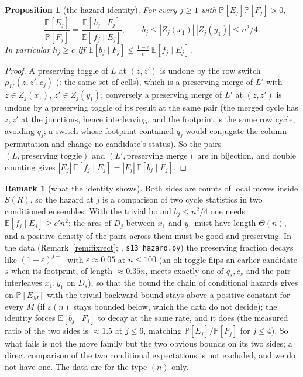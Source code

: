 \documentclass[11pt]{article}
\newtheorem{proposition}[theorem]{Proposition}
\theoremstyle{definition}
\newtheorem{remark}[theorem]{Remark}
\renewcommand{\Pr}{\mathbb{P}}
\begin{document}
\begin{proposition}[the hazard identity]\label{prop:hazardid}
For every $j\ge1$ with $\Pr[E_j]\Pr[F_j]>0$,
\[
\frac{\Pr[E_j]}{\Pr[F_j]}=\frac{\mathbb E[\,b_j\mid F_j]}{\mathbb E[\,f_j\mid E_j]},
\qquad b_j\le|Z_j(x_1)|\,|Z_j(y_1)|\le n^2/4 .
\]
In particular $h_j\ge c$ iff $\mathbb E[b_j\mid F_j]\le\frac{1-c}{c}\,\mathbb E[f_j\mid E_j]$.
\end{proposition}

\begin{proof}
A preserving toggle of $L$ at $(z,z')$ is undone by the row switch $\rho_{L'}(z,z',c_j)$
(\cite[Fact~2.1]{AM26}: the same set of cells), which is a preserving merge of $L'$ with
$z\in Z_j(x_1)$, $z'\in Z_j(y_1)$; conversely a preserving merge of $L'$ at $(z,z')$ is
undone by a preserving toggle of its result at the same pair (the merged cycle has $z,z'$
at the junctions, hence interleaving, and the footprint is the same row cycle, avoiding
$q_j$; a switch whose footprint contained $q_j$ would conjugate the column permutation and
change no candidate's status).  So the pairs $(L,\text{preserving toggle})$ and
$(L',\text{preserving merge})$ are in bijection, and double counting gives
$|E_j|\,\mathbb E[f_j\mid E_j]=|F_j|\,\mathbb E[b_j\mid F_j]$.
\end{proof}

\begin{remark}[what the identity shows]\label{rem:hazardid}
Both sides are counts of local moves inside $S(R)$, so the hazard at $j$ is a comparison
of two cycle statistics in two conditioned ensembles.  With the trivial bound
$b_j\le n^2/4$ one needs $\mathbb E[f_j\mid E_j]\ge c'n^2$: the arcs of $D_j$ between
$x_1$ and $y_1$ must have length $\Theta(n)$, and a positive density of the pairs across
them must be good and preserving.  In the data (Remark~\ref{rem:fixrect}; \cite{repo},
\texttt{s13\_hazard.py}) the preserving fraction decays like $(1-\varepsilon)^{j-1}$ with
$\varepsilon\approx0.05$ at $n\le100$ (an ok toggle flips an earlier candidate $s$ when
its footprint, of length $\approx0.35n$, meets exactly one of $q_s,c_s$ and the pair
interleaves $x_1,y_1$ on $D_s$), so that the bound the chain of conditional hazards gives on
$\Pr[E_M]$ with the trivial backward bound stays above a positive constant for every $M$
(if $\varepsilon(n)$ stays bounded below, which the data do not decide); the identity forces
$\mathbb E[b_j\mid F_j]$ to decay at the same rate, and it does (the measured ratio of
the two sides is $\approx1.5$ at $j\le6$, matching $\Pr[E_j]/\Pr[F_j]$ for $j\le4$).  So what fails is
not the move family but the two obvious bounds on its two sides; a direct comparison of
the two conditional expectations is not excluded, and we do not have one.  The data are
for the type $(n)$ only.
\end{remark}
\end{document}

